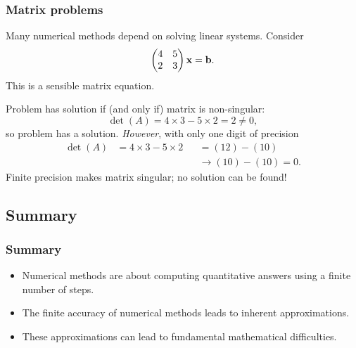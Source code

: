 \documentclass{beamer}
\begin{document}
\begin{frame}
  \frametitle{Matrix problems}

  Many numerical methods depend on solving linear systems. Consider
  \begin{equation*}
    \begin{pmatrix}
      4 & 5 \\ 2 & 3
    \end{pmatrix} {\bf x} = {\bf b}.
  \end{equation*}
  This is a sensible matrix equation. \pause

  Problem has solution if (and only if) matrix is
  non-singular:
  \begin{equation*}
    \det (A) = 4 \times 3 - 5 \times 2 = 2 \neq 0,
  \end{equation*}
  so problem has a solution. \pause
%
  \emph{However}, with only one digit of precision
  \begin{align*}
    \det (A) & = 4 \times 3 - 5 \times 2 && = (12) - (10) \\
             &&& \rightarrow (10) - (10)  = 0.
  \end{align*} \pause
  Finite precision makes matrix singular; no solution can be
  found!

\end{frame}

\subsection{Summary}

\begin{frame}
  \frametitle{Summary}

  \begin{itemize}
  \item Numerical methods are about computing quantitative answers
    using a finite number of steps.
  \item The finite accuracy of numerical methods leads to inherent
    approximations.
  \item These approximations can lead to fundamental mathematical
    difficulties.
  \end{itemize}

\end{frame}
\end{document}
